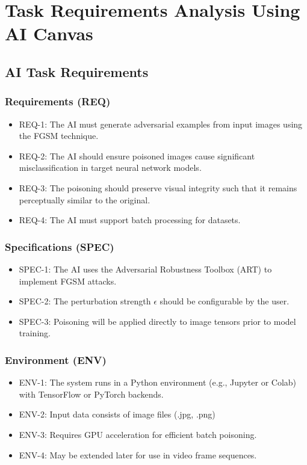 \section{Task Requirements Analysis Using AI Canvas}
\label{section:task-requirements-analysis-using-AI-canvas}
\subsection{AI Task Requirements}

\subsubsection*{Requirements (REQ)}
\begin{itemize}
    \item REQ-1: The AI must generate adversarial examples from input images using the FGSM technique.
    \item REQ-2: The AI should ensure poisoned images cause significant misclassification in target neural network models.
    \item REQ-3: The poisoning should preserve visual integrity such that it remains perceptually similar to the original.
    \item REQ-4: The AI must support batch processing for datasets.
\end{itemize}

\subsubsection*{Specifications (SPEC)}
\begin{itemize}
    \item SPEC-1: The AI uses the Adversarial Robustness Toolbox (ART) to implement FGSM attacks.
    \item SPEC-2: The perturbation strength $\epsilon$ should be configurable by the user.
    \item SPEC-3: Poisoning will be applied directly to image tensors prior to model training.
\end{itemize}

\subsubsection*{Environment (ENV)}
\begin{itemize}
    \item ENV-1: The system runs in a Python environment (e.g., Jupyter or Colab) with TensorFlow or PyTorch backends.
    \item ENV-2: Input data consists of image files (.jpg, .png)
    \item ENV-3: Requires GPU acceleration for efficient batch poisoning.
    \item ENV-4: May be extended later for use in video frame sequences.
\end{itemize}

